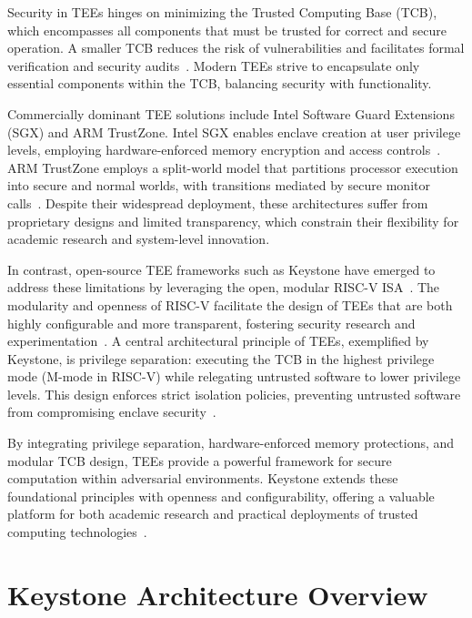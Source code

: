 Security in TEEs hinges on minimizing the Trusted Computing Base (TCB), which encompasses all components that must be trusted for correct and secure operation. A smaller TCB reduces the risk of vulnerabilities and facilitates formal verification and security audits~\cite{lee2019keystone,Survey2023}. Modern TEEs strive to encapsulate only essential components within the TCB, balancing security with functionality.

Commercially dominant TEE solutions include Intel Software Guard Extensions (SGX) and ARM TrustZone. Intel SGX enables enclave creation at user privilege levels, employing hardware-enforced memory encryption and access controls~\cite{costan2016intel}. ARM TrustZone employs a split-world model that partitions processor execution into secure and normal worlds, with transitions mediated by secure monitor calls~\cite{yan2018trustzone}. Despite their widespread deployment, these architectures suffer from proprietary designs and limited transparency, which constrain their flexibility for academic research and system-level innovation.

In contrast, open-source TEE frameworks such as Keystone have emerged to address these limitations by leveraging the open, modular RISC-V ISA~\cite{lee2019keystone,dayeol2019keystone}. The modularity and openness of RISC-V facilitate the design of TEEs that are both highly configurable and more transparent, fostering security research and experimentation~\cite{Survey2023}. A central architectural principle of TEEs, exemplified by Keystone, is privilege separation: executing the TCB in the highest privilege mode (M-mode in RISC-V) while relegating untrusted software to lower privilege levels. This design enforces strict isolation policies, preventing untrusted software from compromising enclave security~\cite{lee2019keystone}.

By integrating privilege separation, hardware-enforced memory protections, and modular TCB design, TEEs provide a powerful framework for secure computation within adversarial environments. Keystone extends these foundational principles with openness and configurability, offering a valuable platform for both academic research and practical deployments of trusted computing technologies~\cite{suzaki2021tsperf}.


\section{Keystone Architecture Overview}


